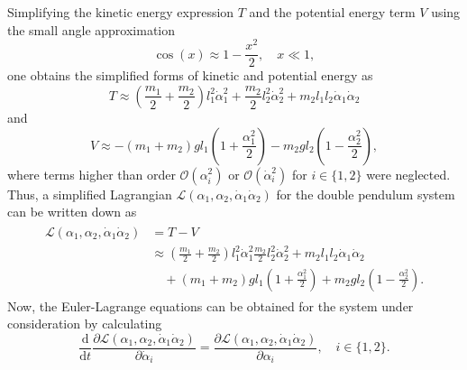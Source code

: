 \documentclass{report}
\numberwithin{tm}{section}
\begin{document}
Simplifying the kinetic energy expression $T$ and the potential energy term $V$ using the small angle approximation \begin{equation}
	\cos(x) \approx 1 - \frac{x^2}{2}, \quad x \ll 1,
\end{equation} one obtains the simplified forms of kinetic and potential energy as \begin{equation}
T \approx \left(\frac{m_1}{2}+ \frac{m_2}{2}\right)l_1^2\dot{\alpha}_1^2 + \frac{m_2}{2}l_2^2\dot{\alpha}_2^2 + m_2l_1l_2\dot{\alpha}_1\dot{\alpha}_2
\end{equation} and \begin{equation}
V \approx -(m_1+m_2)gl_1\left(1+\frac{\alpha_1^2}{2}\right) - m_2gl_2\left(1-\frac{\alpha_2^2}{2}\right),
\end{equation} where terms higher than order $\mathcal{O}(\alpha_i^2)$ or $\mathcal{O}(\dot{\alpha}_i^2)$ for $i \in \{1,2\}$ were neglected. Thus, a simplified Lagrangian $\mathcal{L}(\alpha_1,\alpha_2, \dot{\alpha}_1\dot{\alpha}_2)$ for the double pendulum system can be written down as \begin{align}
\begin{aligned}
	\mathcal{L}(\alpha_1,\alpha_2, \dot{\alpha}_1\dot{\alpha}_2) &= T-V \\
	&\approx \left(\frac{m_1}{2}+ \frac{m_2}{2}\right)l_1^2\dot{\alpha}_1^2  \frac{m_2}{2}l_2^2\dot{\alpha}_2^2 + m_2l_1l_2\dot{\alpha}_1\dot{\alpha}_2 \\ &\quad + (m_1+m_2)gl_1\left(1+\frac{\alpha_1^2}{2}\right) + m_2gl_2\left(1-\frac{\alpha_2^2}{2}\right).
\end{aligned}
\end{align} Now, the Euler-Lagrange equations can be obtained for the system under consideration by calculating \begin{equation}
\frac{\mathrm{d}}{\mathrm{d}t}\frac{\partial \mathcal{L}(\alpha_1,\alpha_2, \dot{\alpha}_1\dot{\alpha}_2)}{\partial \dot{\alpha}_i} = \frac{\partial \mathcal{L}(\alpha_1,\alpha_2, \dot{\alpha}_1\dot{\alpha}_2)}{\partial \alpha_i}, \quad i \in \{1,2\}.
\end{equation}
\end{document}
